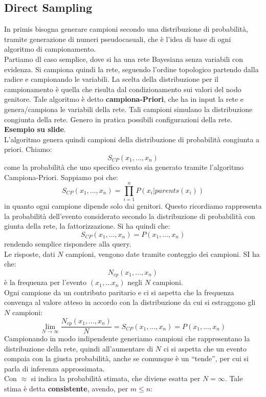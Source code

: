 \documentclass[a4paper,12pt, oneside]{book}
\begin{document}
\subsection{Direct Sampling}
In primis bisogna generare campioni secondo una distribuzione di probabilità,
tramite generazione di numeri pseudocasuali, che è l'idea di base di ogni
algoritmo di campionamento. \\
Partiamo dl caso semplice, dove si ha una rete Bayesiana senza variabili con
evidenza. Si campiona quindi la rete, seguendo l'ordine topologico partendo
dalla radice e campionando le variabili. La scelta della distribuzione per il
campionamento è quella che risulta dal condizionamento sui valori del nodo
genitore. Tale algoritmo è detto \textbf{campiona-Priori}, che ha in input la
rete e genera/campiona le variabili della rete. Tali campioni simulano la
distribuzione congiunta della rete. Genero in pratica possibili configurazioni
della rete. \\
\textbf{Esempio su slide}.\\
L'algoritmo genera quindi campioni della distribuzione di probabilità congiunta
a priori. Chiamo:
\[S_{CP}(x_1,\ldots,x_n)\]
come la probabilità che uno specifico evento sia generato tramite l’algoritmo
Campiona-Priori. Sappiamo poi che:
\[S_{CP}(x_1,\ldots,x_n)=\prod_{i=1}^nP(x_i|parents(x_i))\]
in quanto ogni campione dipende solo dai genitori. Questo ricordiamo rappresenta
la probabilità dell'evento considerato secondo la distribuzione di probabilità
con giunta della rete, la fattorizzazione. Si ha quindi che:
\[S_{CP}(x_1,\ldots,x_n)=P(x_1,\ldots,x_n)\]
rendendo semplice rispondere alla query.\\
Le risposte, dati $N$ campioni, vengono date tramite conteggio dei campioni. SI
ha che:
\[N_{cp}(x_1,\ldots,x_n)\]
è la frequenza per l'evento $(x_1,\ldots x_n)$ negli $N$ campioni.\\
Ogni campione da un contributo paritario e ci si aspetta che la frequenza
convenga al valore atteso in accordo con la distribuzione da cui si estraggono
gli $N$ campioni:
\[\lim_{N\to\infty}\frac{N_{cp}(x_1,\ldots,x_n)}{N}
  =S_{CP}(x_1,\ldots,x_n)=P(x_1,\ldots,x_n)\]
Campionando in modo indipendente generiamo campioni che rappresentano la
distribuzione della rete, quindi all'aumentare di $N$ ci si aspetta che un
evento compaia con la giusta probabilità, anche se comunque è un ``tende'', per
cui si parla di inferenza approssimata.\\
Con $\approx$ si indica la probabilità stimata, che diviene esatta per
$N=\infty$. Tale stima è detta \textbf{consistente}, avendo, per $m\leq n$:
\end{document}
